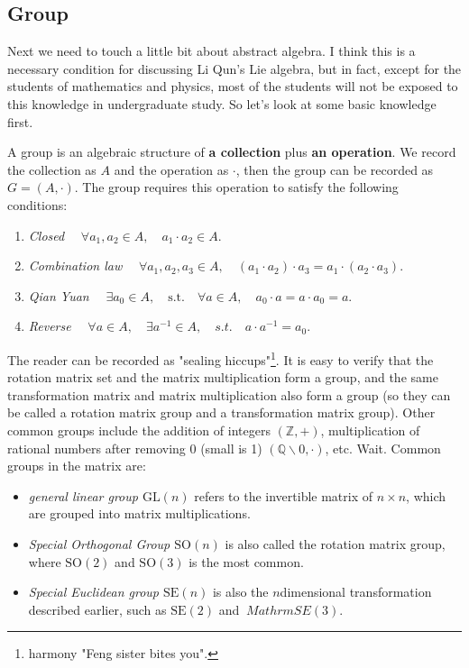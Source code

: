 \subsection{Group}
Next we need to touch a little bit about abstract algebra. I think this is a necessary condition for discussing Li Qun's Lie algebra, but in fact, except for the students of mathematics and physics, most of the students will not be exposed to this knowledge in undergraduate study. So let's look at some basic knowledge first.

A group is an algebraic structure of \textbf{a collection} plus \textbf{an operation}. We record the collection as $A$ and the operation as $\cdot$, then the group can be recorded as $G=(A,\cdot)$. The group requires this operation to satisfy the following conditions:

\begin{enumerate}
\item { \emph{Closed}} $ \quad \forall a_1, a_2 \in A, \quad a_1 \cdot a_2 \in A$.
\item { \emph{Combination law}} $ \quad \forall a_1, a_2, a_3 \in A, \quad (a_1 \cdot a_2) \cdot a_3 = a_1 \cdot ( a_2 \cdot a_3) $.
\item { \emph{Qian Yuan}} $ \quad \exists a_0 \in A, \quad \mathrm{s.t.} \quad \forall a \in A, \quad a_0 \cdot a = a \cdot a_0 = a $.
\item { \emph{Reverse}} $ \quad \forall a \in A, \quad \exists a^{-1} \in A, \quad s.t. \quad a \cdot a^{-1} = a_0 $.
\end{enumerate}

The reader can be recorded as "sealing hiccups"\footnote{harmony "Feng sister bites you". }. It is easy to verify that the rotation matrix set and the matrix multiplication form a group, and the same transformation matrix and matrix multiplication also form a group (so they can be called a rotation matrix group and a transformation matrix group). Other common groups include the addition of integers $(\mathbb{Z}, +)$, multiplication of rational numbers after removing 0 (small is 1) $(\mathbb{Q}\backslash 0, \cdot )$, etc. Wait. Common groups in the matrix are:

\begin{itemize}
\item \emph{general linear group $\mathrm{GL}(n)$} \quad refers to the invertible matrix of $n \times n$, which are grouped into matrix multiplications.
\item \emph{Special Orthogonal Group $\mathrm{SO}(n)$} \quad is also called the rotation matrix group, where $\mathrm{SO}(2)$ and $\mathrm{SO}(3 ) $ is the most common.
\item \emph{Special Euclidean group $\mathrm{SE}(n)$} \quad is also the $n$dimensional transformation described earlier, such as $\mathrm{SE}(2)$ and $\ Mathrm{SE}(3)$.
\end{itemize}

